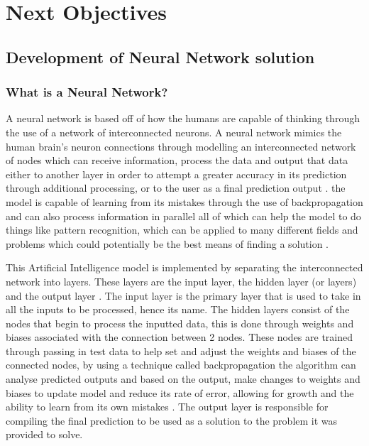 \documentclass[]{final_report}
\begin{document}
\chapter{Next Objectives}

\section{Development of Neural Network solution}
\subsection{What is a Neural Network?}

A neural network is based off of how the humans are capable of thinking through the use of a network of interconnected neurons. A neural network mimics the human brain’s neuron connections through modelling an interconnected network of nodes which can receive information, process the data and output that data either to another layer in order to attempt a greater accuracy in its prediction through additional processing, or to the user as a final prediction output \cite{Dongare2012}. the model is capable of learning from its mistakes through the use of backpropagation and can also process information in parallel all of which can help the model to do things like pattern recognition, which can be applied to many different fields and problems which could potentially be the best means of finding a solution \cite{Woodford2023}. 

This Artificial Intelligence model is implemented by separating the interconnected network into layers. These layers are the input layer, the hidden layer (or layers) and the output layer \cite{IBM2024} . The input layer is the primary layer that is used to take in all the inputs to be processed, hence its name. The hidden layers consist of the nodes that begin to process the inputted data, this is done through weights and biases associated with the connection between 2 nodes. These nodes are trained through passing in test data to help set and adjust the weights and biases of the connected nodes, by using a technique called backpropagation the algorithm can analyse predicted outputs and based on the output, make changes to weights and biases to update model and reduce its rate of error, allowing for growth and the ability to learn from its own mistakes \cite{Schmidhuber2015} . The output layer is responsible for compiling the final prediction to be used as a solution to the problem it was provided to solve. 
\end{document}
